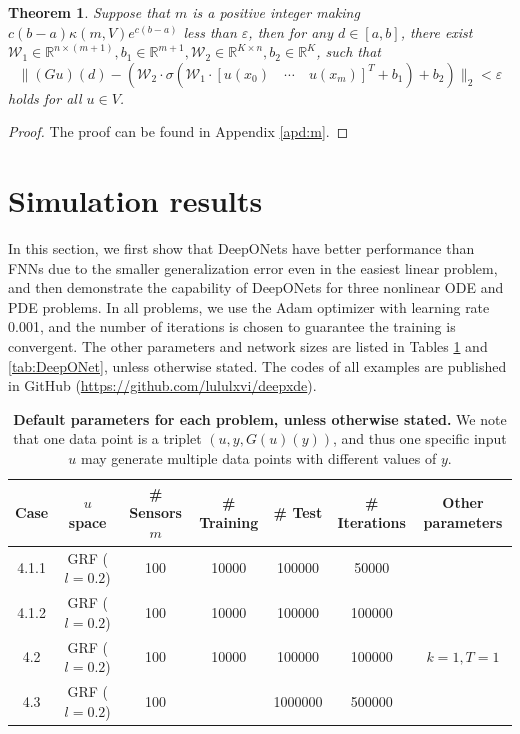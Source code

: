 \documentclass[11pt]{article}
\newtheorem{theorem}{Theorem}
\begin{document}
\begin{theorem}\label{thm:m}
Suppose that $m$ is a positive integer making $c(b-a)\kappa(m,V)e^{c(b-a)}$ less than $\varepsilon$, then for any $d\in [a,b]$, there exist $\mathcal{W}_{1}\in \mathbb{R}^{n\times (m+1)},b_{1}\in \mathbb{R}^{m+1},\mathcal{W}_{2}\in \mathbb{R}^{K\times n},b_{2}\in \mathbb{R}^{K}$, such that
\begin{equation*}
    \|(Gu)(d)-(\mathcal{W}_{2}\cdot\sigma(\mathcal{W}_{1}\cdot [u(x_{0})\quad\cdots\quad u(x_{m})]^{T}+b_{1})+b_{2})\|_{2}<\varepsilon
\end{equation*} 
holds for all $u\in V$.
\end{theorem}
\begin{proof}
The proof can be found in Appendix \ref{apd:m}.
\end{proof}


\section{Simulation results}
\label{sec:result}

In this section, we first show that DeepONets have better performance than FNNs due to the smaller generalization error even in the easiest linear problem, and then demonstrate the capability of DeepONets for three nonlinear ODE and PDE problems. In all problems, we use the Adam optimizer with learning rate 0.001, and the number of iterations is chosen to guarantee the training is convergent. The other parameters and network sizes are listed in Tables \ref{tab:par} and \ref{tab:DeepONet}, unless otherwise stated. The codes of all examples are published in GitHub (\url{https://github.com/lululxvi/deepxde}).

\begin{table}[htbp]
\centering
\caption{\textbf{Default parameters for each problem, unless otherwise stated.} We note that one data point is a triplet $(u, y, G(u)(y))$, and thus one specific input $u$ may generate multiple data points with different values of $y$.}
\label{tab:par}
\begin{tabular}{c|cccccc}
\toprule
Case & $u$ space & \# Sensors $m$ & \# Training & \# Test & \# Iterations & Other parameters \\
\midrule
4.1.1 & GRF ($l=0.2$) & 100 & 10000 & 100000 & 50000 & \\
4.1.2 & GRF ($l=0.2$) & 100 & 10000 & 100000 & 100000 & \\
4.2 & GRF ($l=0.2$) & 100 & 10000 & 100000 & 100000 & $k=1, T=1$ \\
4.3 & GRF ($l=0.2$) & 100 &  & 1000000 & 500000 & \\
\bottomrule
\end{tabular}
\end{table}
\end{document}

